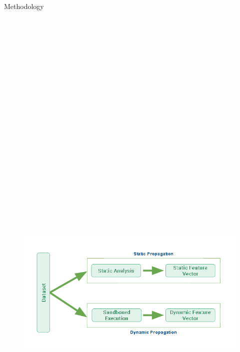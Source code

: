 \documentclass[final]{beamer}
\newlength{\twocolwid}
\begin{document}
\begin{frame}[t]
\begin{columns}[t]
\begin{column}{\twocolwid}


\vspace{0.1in}

\begin{block}{Methodology}
\begin{figure}
\includegraphics[height=29cm,width=50cm]{flow.png}

\end{figure}
\end{block}
\end{column}
\end{columns}
\end{frame}
\end{document}
